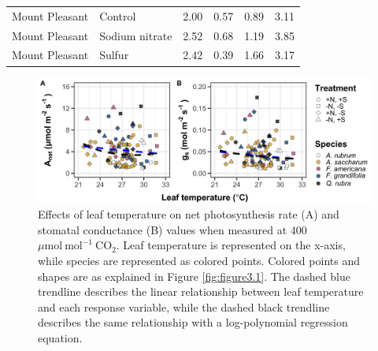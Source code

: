\begin{landscape}
\begin{table}[]
\begin{tabular}{p{3cm}p{3.5cm}p{1.5cm}p{1.5cm}p{2.75cm}p{2.75cm}}
        Mount Pleasant & Control          & \multicolumn{1}{r}{2.00}    & \multicolumn{1}{r}{0.57}  & \multicolumn{1}{r}{0.89}          & \multicolumn{1}{r}{3.11}   \\
        Mount Pleasant & Sodium nitrate   & \multicolumn{1}{r}{2.52}    & \multicolumn{1}{r}{0.68}  & \multicolumn{1}{r}{1.19}          & \multicolumn{1}{r}{3.85}   \\
        Mount Pleasant & Sulfur           & \multicolumn{1}{r}{2.42}    & \multicolumn{1}{r}{0.39}  & \multicolumn{1}{r}{1.66}          & \multicolumn{1}{r}{3.17} \\
        \hline        
    \end{tabular}%
    \end{table}
\end{landscape}
\clearpage

\newpage
\begin{landscape}
    \begin{figure}
        \centering
        \includegraphics[scale = 0.07]{ch3_NxpH/figs/NxS_figS1_leaftemp.png}
        \caption[Effects of leaf temperature on net photosynthesis rate and stomatal conductance values when measured at 400 $\mu \mathrm{mol\ mol^{-1}\ CO_2}$]{Effects of leaf temperature on net photosynthesis rate (A) and stomatal conductance (B) values when measured at 400 $\mu \mathrm{mol\ mol^{-1}\ CO_2}$. Leaf temperature is represented on the x-axis, while species are represented as colored points. Colored points and shapes are as explained in Figure \ref{fig:figure3.1}. The dashed blue trendline describes the linear relationship between leaf temperature and each response variable, while the dashed black trendline describes the same relationship with a log-polynomial regression equation.}
        \label{fig:figure.b1}
    \end{figure}
\end{landscape}
\clearpage
